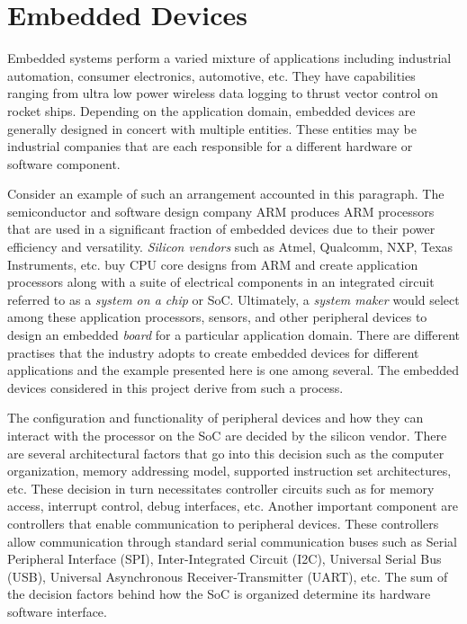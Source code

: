 \section{Embedded Devices}

Embedded systems perform a varied mixture of applications including industrial automation, consumer electronics, automotive, etc. They have capabilities ranging from ultra low power wireless data logging to thrust vector control on rocket ships. Depending on the application domain, embedded devices are generally designed in concert with multiple entities. These entities may be industrial companies that are each responsible for a different hardware or software component.

Consider an example of such an arrangement accounted in this paragraph. The semiconductor and software design company ARM produces ARM processors that are used in a significant fraction of embedded devices due to their power efficiency and versatility. \textit{Silicon vendors} such as Atmel, Qualcomm, NXP, Texas Instruments, etc. buy CPU core designs from ARM and create application processors along with a suite of electrical components in an integrated circuit referred to as a \textit{system on a chip} or SoC. Ultimately, a \textit{system maker} would select among these application processors, sensors, and other peripheral devices to design an embedded \textit{board} for a particular application domain. There are different practises that the industry adopts to create embedded devices for different applications and the example presented here is one among several. The embedded devices considered in this project derive from such a process.

The configuration and functionality of peripheral devices and how they can interact with the processor on the SoC are decided by the silicon vendor. There are several architectural factors that go into this decision such as the computer organization, memory addressing model, supported instruction set architectures, etc. These decision in turn necessitates controller circuits such as for memory access, interrupt control, debug interfaces, etc. Another important component are controllers that enable communication to peripheral devices. These controllers allow communication through standard serial communication buses such as Serial Peripheral Interface (SPI), Inter-Integrated Circuit (I2C), Universal Serial Bus (USB), Universal Asynchronous Receiver-Transmitter (UART), etc. The sum of the decision factors behind how the SoC is organized determine its hardware software interface.

